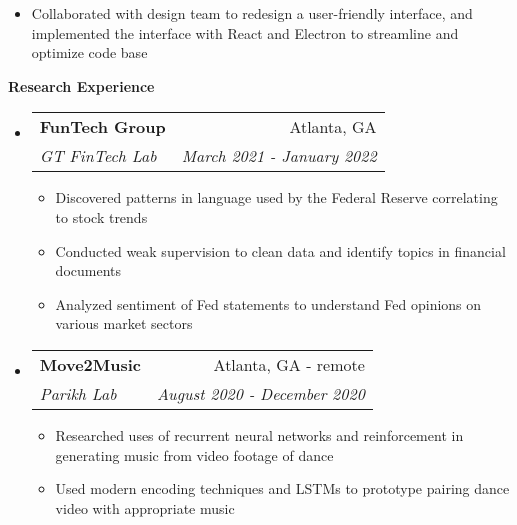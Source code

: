 \documentclass[letterpaper,10pt]{article}
\makeatletter
\newcommand{\resitem}[1]{\item #1 \vspace{-2pt}}
\newcommand{\resheading}[1]{{\large \colorbox{mygrey}{\begin{minipage}{\textwidth}{\textbf{#1 \vphantom{p\^{E}}}}\end{minipage}}}}
\newcommand{\ressubheading}[4]{
\begin{tabular*}{7.0in}{l@{\extracolsep{\fill}}r}
		\textbf{#1} & #2 \\
		\textit{#3} & \textit{#4} \\
\end{tabular*}\vspace{-6pt}}
\makeatother
\begin{document}
\begin{itemize}
\begin{itemize}
        \resitem{Collaborated with design team to redesign a user-friendly interface, and implemented the interface with React and Electron to streamline and optimize code base}
    \end{itemize}
\end{itemize}



\resheading{Research Experience}
\begin{itemize}
\item
    \ressubheading{FunTech Group}{Atlanta, GA}{GT FinTech Lab}{March 2021 - January 2022}
    \begin{itemize}
        \resitem{Discovered patterns in language used by the Federal Reserve correlating to stock trends}
        \resitem{Conducted weak supervision to clean data and identify topics in financial documents}
        \resitem{Analyzed sentiment of Fed statements to understand Fed opinions on various market sectors}
    \end{itemize}
\item
    \ressubheading{Move2Music}{Atlanta, GA - remote}{Parikh Lab}{August 2020 - December 2020}
    \begin{itemize}
        \resitem{Researched uses of recurrent neural networks and reinforcement in generating music from video footage of dance}
        \resitem{Used modern encoding techniques and LSTMs to prototype pairing dance video with appropriate music}
    \end{itemize}
\end{itemize}
\end{document}
